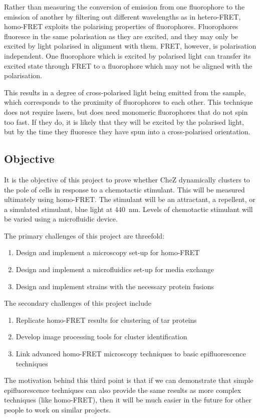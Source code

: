 \documentclass[../main.tex]{subfiles}
\begin{document}
Rather than measuring the conversion of emission from one fluorophore to the emission of another by filtering out different wavelengths as in hetero-FRET, homo-FRET exploits the polarising properties of fluorophores. Fluorophores fluoresce in the same polarisation as they are excited, and they may only be excited by light polarised in alignment with them. FRET, however, is polarisation independent. One fluorophore which is excited by polarised light can transfer its excited state through FRET to a fluorophore which may not be aligned with the polarisation. 

This results in a degree of cross-polarised light being emitted from the sample, which corresponds to the proximity of fluorophores to each other. This technique does not require lasers, but does need monomeric fluorophores that do not spin too fast. If they do, it is likely that they will be excited by the polarised light, but by the time they fluoresce they have spun into a cross-polarised orientation.

\subsection{Objective}
It is the objective of this project to prove whether CheZ dynamically clusters to the pole of \ecoli cells in response to a chemotactic stimulant. This will be measured ultimately using homo-FRET. The stimulant will be an attractant, a repellent, or a simulated stimulant, blue light at \SI{440}{\nano\meter}\cite{wright06}. Levels of chemotactic stimulant will be varied using a microfluidic device.

The primary challenges of this project are threefold:
\begin{enumerate}
\item Design and implement a microscopy set-up for homo-FRET
\item Design and implement a microfluidics set-up for media exchange
\item Design and implement \ecoli strains with the necessary protein fusions
\end{enumerate}

The secondary challenges of this project include
\begin{enumerate}
\item Replicate homo-FRET results for clustering of tar proteins
\item Develop image processing tools for cluster identification
\item Link advanced homo-FRET microscopy techniques to basic epifluorescence techniques
\end{enumerate}
The motivation behind this third point is that if we can demonstrate that simple epifluorescence techniques can also provide the same results as more complex techniques (like homo-FRET), then it will be much easier in the future for other people to work on similar projects.
\end{document}
